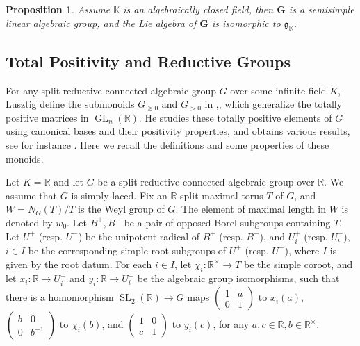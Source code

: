 \documentclass[12pt]{amsart}
\newtheorem{proposition}[theorem]{Proposition}
\begin{document}
\begin{proposition}
    \cite[Cor 4.42,4.44]{notes1}
    Assume $\mathbb{K}$ is an algebraically closed field, then $\mathbf{G}$ is a semisimple linear algebraic group, and the Lie algebra of $\mathbf{G}$ is isomorphic to $\mathfrak{g}_{\mathbb{K}}$.
\end{proposition}


\subsection{Total Positivity and Reductive Groups}
For any split reductive connected algebraic group $G$ over some infinite field $K$, Lusztig define the submonoids $G_{\geq 0}$ and $G_{>0}$ in \cite{TR1},\cite{TR2}, which generalize the totally positive matrices in $\operatorname{GL}_n(\mathbb{R})$.
He studies these totally positive elements of $G$ using canonical bases and their positivity properties, and obtains various results, see for instance \cite{TC}.
Here we recall the definitions and some properties of these monoids.

Let $K=\mathbb{R}$ and let $G$ be a split reductive connected algebraic group over $\mathbb{R}$. 
We assume that $G$ is simply-laced.
Fix an $\mathbb{R}$-split maximal torus $T$ of $G$, and $W=N_G(T)/T$ is the Weyl group of $G$.
The element of maximal length in $W$ is denoted by $w_0$.
Let $B^+,B^-$ be a pair of opposed Borel subgroups containing $T$. 
Let $U^+$ (resp. $U^-$) be the unipotent radical of $B^+$ (resp. $B^-$), and $U^+_i$ (resp. $U^-_i$), $i\in I$ be the corresponding simple root subgroups of $U^+$ (resp. $U^-$), where $I$ is given by the root datum.
For each $i\in I$, let $\chi_i:\mathbb{R}^{\times}\rightarrow T$ be the simple coroot, and let $x_i:\mathbb{R}\rightarrow U^+_i$ and $y_i:\mathbb{R}\rightarrow U^-_i$ be the algebraic group isomorphisms, such that there is a homomorphism $\operatorname{SL}_2(\mathbb{R})\rightarrow G$ maps 
$\begin{pmatrix}
    1 & a \\ 0 & 1
\end{pmatrix}$
to $x_i(a)$, 
$\begin{pmatrix}
    b & 0 \\ 0 & b^{-1}
\end{pmatrix}$
to $\chi_i(b)$, and
$\begin{pmatrix}
    1 & 0 \\ c & 1
\end{pmatrix}$ 
to $y_i(c)$, for any $a,c\in \mathbb{R}, b\in \mathbb{R}^{\times}$.
\end{document}
